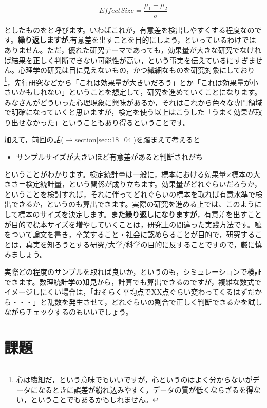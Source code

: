 \documentclass{ltjsarticle}
\begin{document}
\[ EffectSize =  \frac{\mu_1-\mu_2}{\sigma} \]

としたものをと呼びます。いわばこれが，有意差を検出しやすくする程度なのです。\textbf{繰り返しますが},有意差を出すことを目的にしよう，といっているわけではありません。ただ，優れた研究テーマであっても，効果量が大きな研究でなければ結果を正しく判断できない可能性が高い，という事実を伝えているにすぎません。心理学の研究は目に見えないもの，かつ繊細なものを研究対象にしており\footnote{心は繊細だ，という意味でもいいですが，心というのはよく分からないがデータになるときに誤差が紛れ込みやすく，データの質が低くならざるを得ない，ということでもあるかもしれません。}，先行研究などから「これは効果量が大きいだろう」とか「これは効果量が小さいかもしれない」ということを想定して，研究を進めていくことになります。みなさんがどういった心理現象に興味があるか，それはこれから色々な専門領域で明確になっていくと思いますが，検定を使う以上はこうした「うまく効果が取り出せなかった」ということもあり得るということです。

加えて，前回の話($\to$section\ref{sec::18_04})を踏まえて考えると
\begin{itemize}
    \item サンプルサイズが大きいほど有意差があると判断されがち
\end{itemize}
ということがわかります。検定統計量は一般に，標本における効果量$\times$標本の大きさ＝検定統計量，という関係が成り立ちます。効果量がどれぐらいだろうか，ということを検討すれば，それに伴ってどれぐらいの標本を取れば有意水準で検出できるか，というのも算出できます。実際の研究を進める上では、このようにして標本のサイズを決定します。\textbf{また繰り返しになりますが}，有意差を出すことが目的で標本サイズを増やしていくことは，研究上の間違った実践方法です。嘘をついて論文を書き，卒業すること・社会に認めらることが目的で，研究することは，真実を知ろうとする研究/大学/科学の目的に反することですので，厳に慎みましょう。

実際どの程度のサンプルを取れば良いか，というのも，シミュレーションで検証できます。数理統計学の知見から，計算でも算出できるのですが，複雑な数式でイメージしにくい場合は，「おそらく平均点でXX点ぐらい変わってくるはずだから・・・」と乱数を発生させて，どれぐらいの割合で正しく判断できるかを試しながらチェックするのもいいでしょう。
\section{課題}
\end{document}
